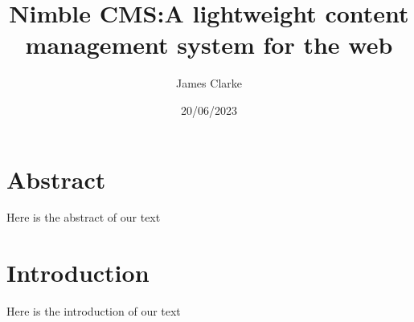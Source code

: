 \documentclass[12pt]{report}
\title{Nimble CMS:\@ A lightweight content management system for the web}
\author{James Clarke}
\date{20/06/2023}
\begin{document}
\maketitle

\section{Abstract}

Here is the abstract of our text

\section{Introduction}

Here is the introduction of our text
\end{document}

